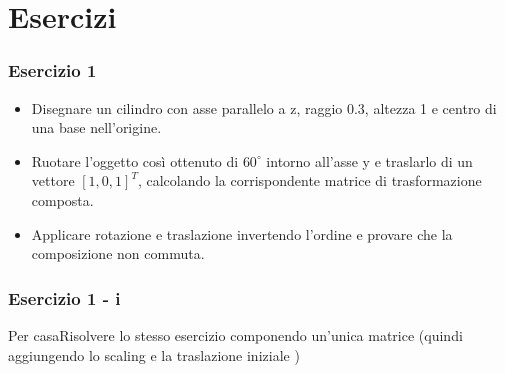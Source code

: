 \documentclass{beamer}
\newcommand{\fig}{figures} %
\begin{document}
\section{Esercizi}
%
\begin{frame}
\frametitle{Esercizio 1}
\begin{itemize}
\item Disegnare un cilindro con asse parallelo a z, raggio 0.3, altezza 1 e centro di una base nell'origine.
\item Ruotare l'oggetto cos\`i ottenuto di $60^\circ$ intorno all'asse y e traslarlo di un vettore 
$[1,0,1]^T$, calcolando la corrispondente matrice di trasformazione composta.
\item Applicare rotazione e traslazione invertendo l'ordine e provare che la composizione non commuta.
\end{itemize}
\end{frame}
\begin{frame}
\frametitle{Esercizio 1 - i}
\begin{center}
\end{center}
\begin{block}{Per casa}{Risolvere lo stesso esercizio componendo un'unica matrice (quindi aggiungendo lo scaling e la traslazione iniziale )}
\end{block}
\end{frame}
\end{document}
